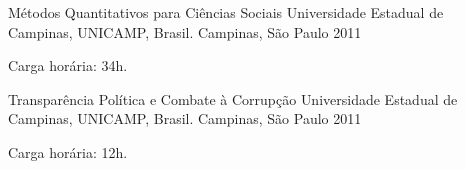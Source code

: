 \begin{cventries}
\cventry
        {Métodos Quantitativos para Ciências Sociais}
        {Universidade Estadual de Campinas, UNICAMP, Brasil.}
        {Campinas, São Paulo}
        {2011}
        {
         \begin{cvitems}
           \item Carga horária: 34h.
          \end{cvitems}
        }
\cventry
        {Transparência Política e Combate à Corrupção}
        {Universidade Estadual de Campinas, UNICAMP, Brasil.}
        {Campinas, São Paulo}
        {2011}
        {
         \begin{cvitems}
           \item Carga horária: 12h.
          \end{cvitems}
        }
\end{cventries}
